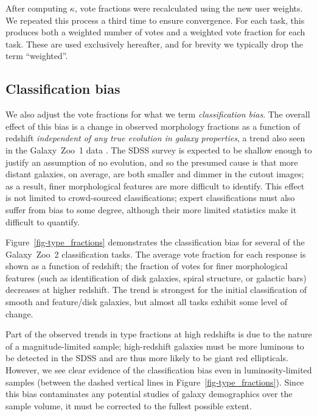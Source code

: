 \documentclass[useAMS,usenatbib]{mn2e}
\begin{document}
After computing $\kappa$, vote fractions were recalculated using the new user weights. We repeated this process a third time to ensure convergence. For each task, this produces both a weighted number of votes and a weighted vote fraction for each task. These are used exclusively hereafter, and for brevity we typically drop the term ``weighted''. 

\subsection{Classification bias}\label{ssec-classificationbias}

We also adjust the vote fractions for what we term {\it classification bias}. The overall effect of this bias is a change in observed morphology fractions as a function of redshift {\em independent of any true evolution in galaxy properties}, a trend also seen in the Galaxy~Zoo~1 data \citep{bam09}. The SDSS survey is expected to be shallow enough to justify an assumption of no evolution, and so the presumed cause is that more distant galaxies, on average, are both smaller and dimmer in the cutout images; as a result, finer morphological features are more difficult to identify. This effect is not limited to crowd-sourced classifications; expert classifications must also suffer from bias to some degree, although their more limited statistics make it difficult to quantify. 

Figure~\ref{fig-type_fractions} demonstrates the classification bias for several of the Galaxy~Zoo~2 classification tasks. The average vote fraction for each response is shown as a function of redshift; the fraction of votes for finer morphological features (such as identification of disk galaxies, spiral structure, or galactic bars) decreases at higher redshift. The trend is strongest for the initial classification of smooth and feature/disk galaxies, but almost all tasks exhibit some level of change. 

Part of the observed trends in type fractions at high redshifts is due to the nature of a magnitude-limited sample; high-redshift galaxies must be more luminous to be detected in the SDSS and are thus more likely to be giant red ellipticals. However, we see clear evidence of the classification bias even in luminosity-limited samples (between the dashed vertical lines in Figure~\ref{fig-type_fractions}). Since this bias contaminates any potential studies of galaxy demographics over the sample volume, it must be corrected to the fullest possible extent. 
\end{document}
